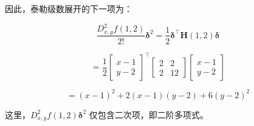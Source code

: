 \begin{notebox}
因此，泰勒级数展开的下一项为：

\begin{equation}
\frac{D_{x,y}^2 f(1, 2)}{2!} \boldsymbol{\delta}^2 = \frac{1}{2} \boldsymbol{\delta}^\top \boldsymbol{H}(1, 2) \boldsymbol{\delta}
\tag{5.173a}\label{eq:5-173a}
\end{equation}

\begin{equation}
= \frac{1}{2} \begin{bmatrix} x - 1 \\ y - 2 \end{bmatrix}^\top \begin{bmatrix} 2 & 2 \\ 2 & 12 \end{bmatrix} \begin{bmatrix} x - 1 \\ y - 2 \end{bmatrix}
\tag{5.173b}\label{eq:5-173b}
\end{equation}

\begin{equation}
= (x - 1)^2 + 2(x - 1)(y - 2) + 6(y - 2)^2
\tag{5.173c}\label{eq:5-173c}
\end{equation}

这里，$ D_{x,y}^2 f(1, 2)\boldsymbol{\delta}^2 $ 仅包含二次项，即二阶多项式。
\end{notebox}

